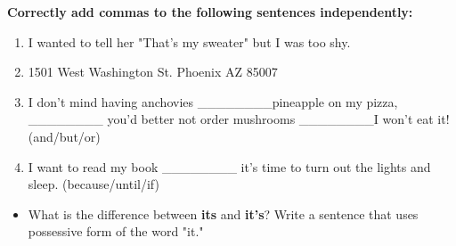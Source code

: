 \documentclass[12pt]{article}
\begin{document}
\vspace{1em}

\begin{tcolorbox}[colframe=black!60, colback=white, 
coltitle=black, colbacktitle=black!15, fonttitle=\bfseries\Large, 
title=Independent Practice, halign title=center, left=10pt, right=10pt, top=10pt, bottom=15pt]
\textbf{Correctly add commas to the following sentences independently:}
\begin{enumerate}[itemsep=3em] %
    \item I wanted to tell her "That's my sweater" but I was too shy.
    \item   1501 West Washington St. Phoenix AZ 85007
    \item I don't mind having anchovies \_\_\_\_\_\_\_\_pineapple on my pizza, \_\_\_\_\_\_\_\_ you'd better not order mushrooms \_\_\_\_\_\_\_\_I won't eat it!   (and/but/or)
    \item I want to read my book \_\_\_\_\_\_\_\_ it's time to turn out the lights and sleep. (because/until/if)

\end{enumerate}
\end{tcolorbox}

\vspace{1em}

\begin{tcolorbox}[colframe=black!60, colback=white, 
coltitle=black, colbacktitle=black!15, fonttitle=\bfseries\Large, 
title=Exit Ticket, halign title=center, left=10pt, right=10pt, top=10pt, bottom=15pt]

\begin{itemize}
    \item What is the difference between \textbf{its} and \textbf{it's}? Write a sentence that uses possessive form of the word "it."
\vspace{8em}

\end{itemize}
\end{tcolorbox}
\end{document}
